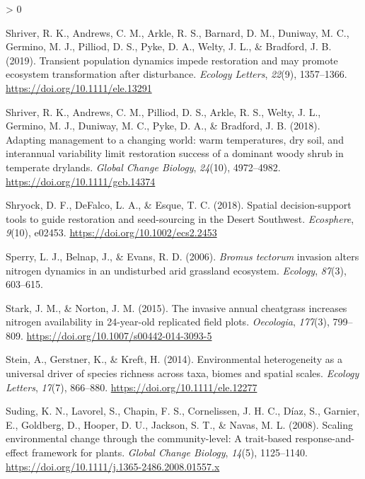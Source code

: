 \documentclass[
  11pt,
  a4paper,
]{article}
\newlength{\cslhangindent}
\newenvironment{CSLReferences}[2] %
 {%
  \setlength{\parindent}{0pt}
  \ifodd #1 \everypar{\setlength{\hangindent}{\cslhangindent}}\ignorespaces\fi
  \ifnum #2 > 0
  \setlength{\parskip}{#2\baselineskip}
  \fi
 }%
 {}
\begin{document}
\begin{CSLReferences}{1}{0}
\leavevmode\hypertarget{ref-Shriver2019}{}%
Shriver, R. K., Andrews, C. M., Arkle, R. S., Barnard, D. M., Duniway, M. C., Germino, M. J., Pilliod, D. S., Pyke, D. A., Welty, J. L., \& Bradford, J. B. (2019). {Transient population dynamics impede restoration and may promote ecosystem transformation after disturbance}. \emph{Ecology Letters}, \emph{22}(9), 1357--1366. \url{https://doi.org/10.1111/ele.13291}

\leavevmode\hypertarget{ref-Shriver2018}{}%
Shriver, R. K., Andrews, C. M., Pilliod, D. S., Arkle, R. S., Welty, J. L., Germino, M. J., Duniway, M. C., Pyke, D. A., \& Bradford, J. B. (2018). {Adapting management to a changing world: warm temperatures, dry soil, and interannual variability limit restoration success of a dominant woody shrub in temperate drylands}. \emph{Global Change Biology}, \emph{24}(10), 4972--4982. \url{https://doi.org/10.1111/gcb.14374}

\leavevmode\hypertarget{ref-Shryock2018}{}%
Shryock, D. F., DeFalco, L. A., \& Esque, T. C. (2018). Spatial decision-support tools to guide restoration and seed-sourcing in the {Desert} {Southwest}. \emph{Ecosphere}, \emph{9}(10), e02453. \url{https://doi.org/10.1002/ecs2.2453}

\leavevmode\hypertarget{ref-Sperry2006}{}%
Sperry, L. J., Belnap, J., \& Evans, R. D. (2006). {\emph{Bromus tectorum} invasion alters nitrogen dynamics in an undisturbed arid grassland ecosystem}. \emph{Ecology}, \emph{87}(3), 603--615.

\leavevmode\hypertarget{ref-Stark2015}{}%
Stark, J. M., \& Norton, J. M. (2015). {The invasive annual cheatgrass increases nitrogen availability in 24-year-old replicated field plots}. \emph{Oecologia}, \emph{177}(3), 799--809. \url{https://doi.org/10.1007/s00442-014-3093-5}

\leavevmode\hypertarget{ref-Stein2014}{}%
Stein, A., Gerstner, K., \& Kreft, H. (2014). {Environmental heterogeneity as a universal driver of species richness across taxa, biomes and spatial scales}. \emph{Ecology Letters}, \emph{17}(7), 866--880. \url{https://doi.org/10.1111/ele.12277}

\leavevmode\hypertarget{ref-Suding2008}{}%
Suding, K. N., Lavorel, S., Chapin, F. S., Cornelissen, J. H. C., Díaz, S., Garnier, E., Goldberg, D., Hooper, D. U., Jackson, S. T., \& Navas, M. L. (2008). {Scaling environmental change through the community-level: A trait-based response-and-effect framework for plants}. \emph{Global Change Biology}, \emph{14}(5), 1125--1140. \url{https://doi.org/10.1111/j.1365-2486.2008.01557.x}


\end{CSLReferences}
\end{document}
